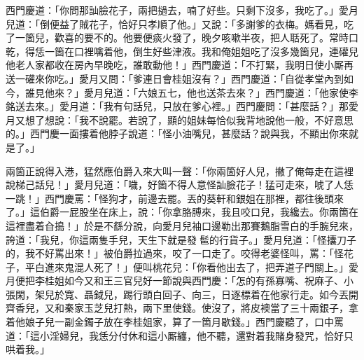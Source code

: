 西門慶道：「你問那訕臉花子，兩把撾去，喃了好些。只剩下沒多，我吃了。」愛月兒道：「倒便益了賊花子，恰好只孝順了他。」{}又說：「多謝爹的衣梅。媽看見，吃了一箇兒，歡喜的要不的。他要便痰火發了，晚夕咳嗽半夜，把人聒死了。常時口乾，得恁一箇在口裡噙着他，倒生好些津液。我和俺姐姐吃了沒多幾箇兒，連礶兒他老人家都收在房內早晚吃，誰敢動他！」西門慶道：「不打緊，我明日使小厮再送一礶來你吃。」愛月又問：「爹連日會桂姐沒有？」西門慶道：「自從孝堂內到如今，誰見他來？」愛月兒道：「六娘五七，他也送茶去來？」西門慶道：「他家使李銘送去來。」愛月道：「我有句話兒，只放在爹心裡。」西門慶問：「甚麼話？」那愛月又想了想說：「我不說罷。{}若說了，顯的姐妹每恰似我背地說他一般，不好意思的。」西門慶一面摟着他脖子說道：「怪小油嘴兒，甚麼話？說與我，不顯出你來就是了。」

兩箇正說得入港，猛然應伯爵入來大叫一聲：{}「你兩箇好人兒，撇了俺每走在這裡說梯己話兒！」愛月兒道：「噦，好箇不得人意怪訕臉花子！猛可走來，唬了人恁一跳！」西門慶罵：「怪狗才，前邊去罷。丟的葵軒和銀姐在那裡，都往後頭來了。」這伯爵一屁股坐在床上，說：「你拿胳膊來，我且咬口兒，我纔去。你兩箇在這裡盡着㒲搗！」於是不繇分說，向愛月兒袖口邊勒出那賽鵝脂雪白的手腕兒來，{}誇道：「我兒，你這兩隻手兒，天生下就是發𩫻䯲的行貨子。」{}{}愛月兒道：「怪攮刀子的，我不好罵出來！」被伯爵拉過來，咬了一口走了。咬得老婆怪叫，罵：「怪花子，平白進來鬼混人死了！」便叫桃花兒：「你看他出去了，把弄道子門關上。」愛月便把李桂姐如今又和王三官兒好一節說與西門慶：「怎的有孫寡嘴、祝麻子、小張閑，架兒於寬、聶鉞兒，踢行頭白回子、向三，日逐標着在他家行走。如今丟開齊香兒，又和秦家玉芝兒打熱，兩下里使錢。使沒了，將皮襖當了三十兩銀子，拿着他娘子兒一副金鐲子放在李桂姐家，算了一箇月歇錢。」西門慶聽了，口中罵道：「這小淫婦兒，我恁分付休和這小厮纏，他不聽，還對着我賭身發咒，恰好只哄着我。」

